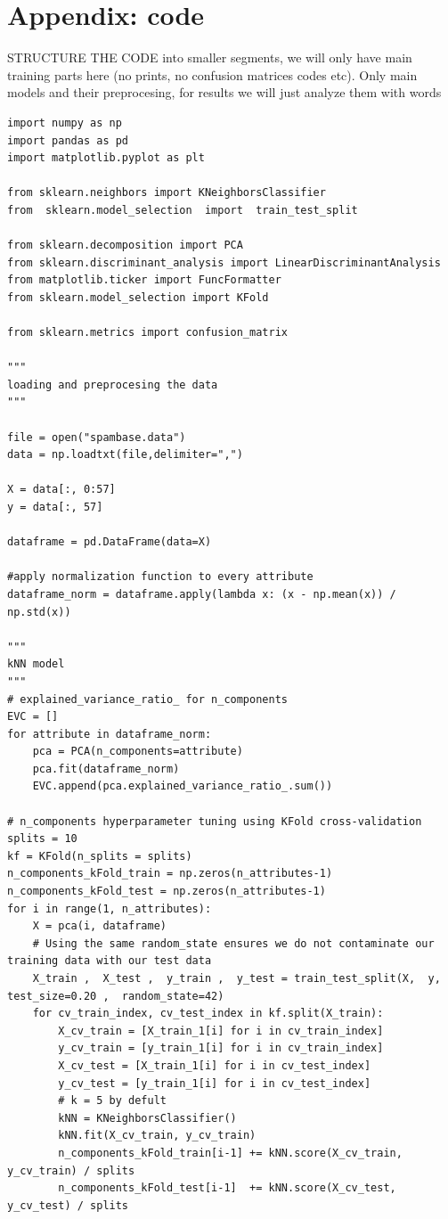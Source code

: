 \documentclass[11pt,a4paper]{article}
\begin{document}
\section*{Appendix: code}
STRUCTURE THE CODE into smaller segments, we will only have main training parts here (no prints, no confusion matrices codes etc). Only main models and their preprocesing, for results we will just analyze them with words
\begin{lstlisting}
import numpy as np
import pandas as pd
import matplotlib.pyplot as plt

from sklearn.neighbors import KNeighborsClassifier
from  sklearn.model_selection  import  train_test_split

from sklearn.decomposition import PCA
from sklearn.discriminant_analysis import LinearDiscriminantAnalysis
from matplotlib.ticker import FuncFormatter
from sklearn.model_selection import KFold

from sklearn.metrics import confusion_matrix

"""
loading and preprocesing the data
"""

file = open("spambase.data")
data = np.loadtxt(file,delimiter=",")

X = data[:, 0:57]
y = data[:, 57]

dataframe = pd.DataFrame(data=X)

#apply normalization function to every attribute
dataframe_norm = dataframe.apply(lambda x: (x - np.mean(x)) / np.std(x))

"""
kNN model
"""
# explained_variance_ratio_ for n_components
EVC = []
for attribute in dataframe_norm:
    pca = PCA(n_components=attribute)
    pca.fit(dataframe_norm)
    EVC.append(pca.explained_variance_ratio_.sum())

# n_components hyperparameter tuning using KFold cross-validation
splits = 10
kf = KFold(n_splits = splits)
n_components_kFold_train = np.zeros(n_attributes-1)
n_components_kFold_test = np.zeros(n_attributes-1)
for i in range(1, n_attributes):
    X = pca(i, dataframe)
    # Using the same random_state ensures we do not contaminate our training data with our test data
    X_train ,  X_test ,  y_train ,  y_test = train_test_split(X,  y,  test_size=0.20 ,  random_state=42)
    for cv_train_index, cv_test_index in kf.split(X_train):
        X_cv_train = [X_train_1[i] for i in cv_train_index]
        y_cv_train = [y_train_1[i] for i in cv_train_index]
        X_cv_test = [X_train_1[i] for i in cv_test_index]
        y_cv_test = [y_train_1[i] for i in cv_test_index]
        # k = 5 by defult
        kNN = KNeighborsClassifier()
        kNN.fit(X_cv_train, y_cv_train) 
        n_components_kFold_train[i-1] += kNN.score(X_cv_train, y_cv_train) / splits
        n_components_kFold_test[i-1]  += kNN.score(X_cv_test, y_cv_test) / splits


\end{lstlisting}
\end{document}
